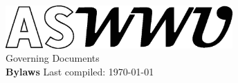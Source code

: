 \documentclass[10pt, letterpaper]{book}
\begin{document}
\nolinenumbers
\begin{titlepage}
    \begin{center}
        \vspace*{5cm}
  		\includegraphics[width=0.65\textwidth]{Logo_ASWWU-Black}\\
        \LARGE Governing Documents\\ \Huge \textbf{Bylaws}
        \vfill
        \normalsize Last compiled: \today\ \currenttime
             
    \end{center}
 \end{titlepage}
\setcounter{tocdepth}{1}
\tableofcontents
\linenumbers
\newpage
\end{document}
